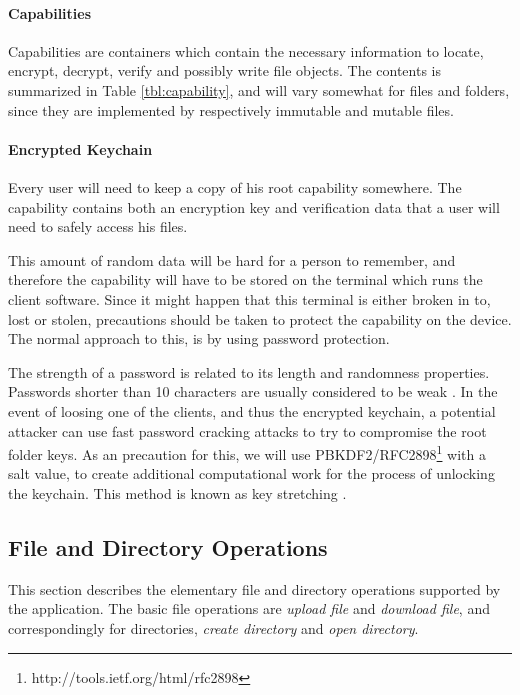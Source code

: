 \documentclass[pdftex,english,10pt,b5paper,twoside]{book}
\begin{document}
\paragraph{Capabilities} Capabilities are containers which contain the
necessary information to locate, encrypt, decrypt, verify and possibly write
file objects. The contents is summarized in Table \ref{tbl:capability}, and
will vary somewhat for files and folders, since they are implemented by
respectively immutable and mutable files.



\paragraph{Encrypted Keychain} Every user will need to keep a copy of his root
capability somewhere. The capability contains both an encryption key and
verification data that a user will need to safely access his files.

This amount of random data will be hard for a person to remember, and therefore
the capability will have to be stored on the terminal which runs the client
software. Since it might happen that this terminal is either broken in to,
lost or stolen, precautions should be taken to protect the capability on the
device. The normal approach to this, is by using password protection.

The strength of a password is related to its length and randomness properties.
Passwords shorter than 10 characters are usually considered to be weak
\cite{pbkdf_nist}. In the event of loosing one of the clients, and thus the
encrypted keychain, a potential attacker can use fast password cracking attacks
to try to compromise the root folder keys. As an precaution for this, we will
use \ac{PBKDF2}/RFC2898\footnote{http://tools.ietf.org/html/rfc2898} with a
salt value, to create additional computational work for the process of
unlocking the keychain. This method is known as key stretching
\cite{keystretch}.

\subsection{File and Directory Operations}
\label{sec:CS:DO}

This section describes the elementary file and directory operations supported
by the application. The basic file operations are \emph{upload file} and
\emph{download file}, and correspondingly for directories, \emph{create
directory} and \emph{open directory}.
\end{document}
